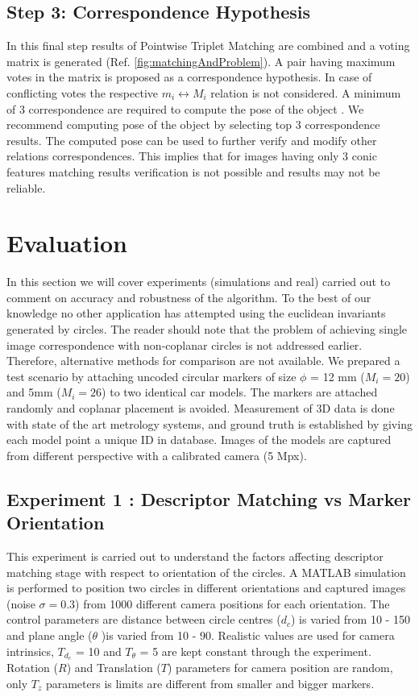 \documentclass{bmvc2k}
\begin{document}
\subsection{Step 3: Correspondence Hypothesis }
\label{subSec:CHypo}
In this final step results of Pointwise Triplet Matching are combined and a voting matrix is generated (Ref. \ref{fig:matchingAndProblem}). A pair having maximum votes in the matrix is proposed as a correspondence hypothesis. In case of conflicting votes the respective $ m_i \leftrightarrow M_i $ relation is not considered. A minimum of 3 correspondence are required to compute the pose of the object \cite{lepetit_monocular_2005}. We recommend computing pose of the object by 
selecting top 3 correspondence results. The computed pose can be used to further verify and modify other relations correspondences. This implies that for images having only 3 conic features matching results verification is not possible and results may not be reliable. 

\section{Evaluation}
In this section we will cover experiments (simulations and real) carried out to comment on accuracy and robustness of the algorithm. To the best of our knowledge no other application has attempted using the euclidean invariants generated by circles. 
The reader should note that the problem of achieving single image correspondence with non-coplanar circles is not addressed earlier. Therefore, alternative methods for comparison are not available. 
We prepared a test scenario by attaching uncoded circular markers of size $ \phi $ = 12 mm ($ M_i = 20 $) and 5mm ($ M_i  = 26$) to two identical car models.  
The markers are attached randomly and coplanar placement is avoided.
Measurement of 3D data is done with state of the art metrology systems, and ground truth is established by giving each model point a unique ID in database. 
Images of the models are captured from different perspective with a calibrated camera (5 Mpx). 

\subsection{Experiment 1 : Descriptor Matching vs Marker Orientation}
This experiment is carried out to understand the factors affecting descriptor matching stage with respect to orientation of the circles.
A MATLAB simulation is performed to position two circles in different orientations and captured images (noise $ \sigma = 0.3 $) from 1000 different camera positions for each orientation.  
The control parameters are distance between circle centres ($ d_c $) is varied from 10 - 150 and plane angle ($ \theta $ )is varied from 10 - 90. Realistic values are used for camera intrinsics, $ T_{d_c} $ = 10 and $ T_\theta $ = 5 are kept constant through the experiment. Rotation ($ R $) and Translation ($ T $) parameters for camera position are random, only $ T_z $ parameters is limits are different from smaller and bigger markers. 
\end{document}

